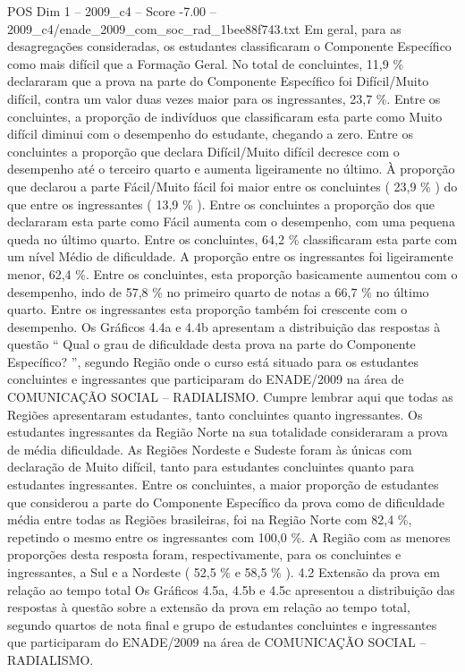 \begin{textsample}{POS Dim 1 – 2009\_c4 – Score -7.00 – 2009\_c4/enade\_2009\_com\_soc\_rad\_1bee88f743.txt}
Em geral, para as desagregações consideradas, os estudantes classificaram o Componente Específico como mais difícil que a Formação Geral.
No total de concluintes, 11,9 \% declararam que a prova na parte do Componente Específico foi Difícil/Muito difícil, contra um valor duas vezes maior para os ingressantes, 23,7 \%.
Entre os concluintes, a proporção de indivíduos que classificaram esta parte como Muito difícil diminui com o desempenho do estudante, chegando a zero.
Entre os concluintes a proporção que declara Difícil/Muito difícil decresce com o desempenho até o terceiro quarto e aumenta ligeiramente no último.
À proporção que declarou a parte Fácil/Muito fácil foi maior entre os concluintes ( 23,9 \% ) do que entre os ingressantes ( 13,9 \% ).
Entre os concluintes a proporção dos que declararam esta parte como Fácil aumenta com o desempenho, com uma pequena queda no último quarto.
Entre os concluintes, 64,2 \% classificaram esta parte com um nível Médio de dificuldade.
A proporção entre os ingressantes foi ligeiramente menor, 62,4 \%.
Entre os concluintes, esta proporção basicamente aumentou com o desempenho, indo de 57,8 \% no primeiro quarto de notas a 66,7 \% no último quarto.
Entre os ingressantes esta proporção também foi crescente com o desempenho.
Os Gráficos 4.4a e 4.4b apresentam a distribuição das respostas à questão “ Qual o grau de dificuldade desta prova na parte do Componente Específico? ”, segundo Região onde o curso está situado para os estudantes concluintes e ingressantes que participaram do ENADE/2009 na área de COMUNICAÇÃO SOCIAL – RADIALISMO.
Cumpre lembrar aqui que todas as Regiões apresentaram estudantes, tanto concluintes quanto ingressantes.
Os estudantes ingressantes da Região Norte na sua totalidade consideraram a prova de média dificuldade.
As Regiões Nordeste e Sudeste foram às únicas com declaração de Muito difícil, tanto para estudantes concluintes quanto para estudantes ingressantes.
Entre os concluintes, a maior proporção de estudantes que considerou a parte do Componente Específico da prova como de dificuldade média entre todas as Regiões brasileiras, foi na Região Norte com 82,4 \%, repetindo o mesmo entre os ingressantes com 100,0 \%.
A Região com as menores proporções desta resposta foram, respectivamente, para os concluintes e ingressantes, a Sul e a Nordeste ( 52,5 \% e 58,5 \% ). 4.2 Extensão da prova em relação ao tempo total Os Gráficos 4.5a, 4.5b e 4.5c apresentou a distribuição das respostas à questão sobre a extensão da prova em relação ao tempo total, segundo quartos de nota final e grupo de estudantes concluintes e ingressantes que participaram do ENADE/2009 na área de COMUNICAÇÃO SOCIAL – RADIALISMO.

\end{textsample}
